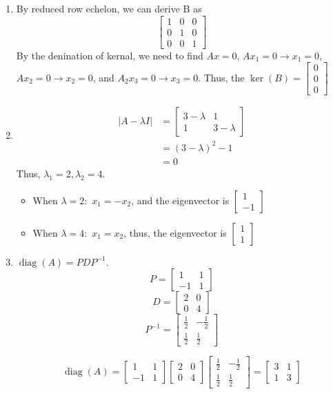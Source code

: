 \documentclass[11pt]{article} %
\begin{document}
\begin{enumerate}
\item By reduced row echelon, we can derive B as 
$$\begin{bmatrix}
	1&0&0\\0&1&0\\0&0&1
\end{bmatrix}$$
By the denination of kernal, we need to find $Ax=0$, $Ax_1=0\rightarrow x_1=0$, $Ax_2=0\rightarrow x_2=0$, and $A_2x_3=0\rightarrow x_3=0$. 
Thus, the $\ker (B)=\begin{bmatrix}
	0\\0\\0
\end{bmatrix}$
\item 
\begin{align*}
	|A-\lambda I|&=\begin{bmatrix}
		3-\lambda&1\\1&3-\lambda
	\end{bmatrix}\\
&=(3-\lambda)^2-1\\
&=0
\end{align*}
Thus, $\lambda_1=2, \lambda_2=4$.
\begin{itemize}
	\item When $\lambda=2:$
	$x_1=-x_2$, and the eigenvector is $\begin{bmatrix}
		1\\-1
	\end{bmatrix}$
\item When $\lambda=4:$
$x_1=x_2$, thus, the eigenvector is $\begin{bmatrix}
	1\\1
\end{bmatrix}$
\end{itemize}


\item 
$\operatorname{diag}{(A)}=PDP^{-1}$. 
$$P=\begin{bmatrix}
	1&1\\-1&1
\end{bmatrix}$$
$$D=\begin{bmatrix}
	2&0\\0&4
\end{bmatrix}$$
$$P^{-1}=\begin{bmatrix}
	\frac{1}{2}&-\frac{1}{2}\\\frac{1}{2}&\frac{1}{2}
\end{bmatrix}$$

$$\operatorname{diag}{(A)}=\begin{bmatrix}
	1&1\\-1&1
\end{bmatrix}\begin{bmatrix}
2&0\\0&4
\end{bmatrix}\begin{bmatrix}
\frac{1}{2}&-\frac{1}{2}\\\frac{1}{2}&\frac{1}{2}
\end{bmatrix}=\begin{bmatrix}
3&1\\1&3
\end{bmatrix}$$


\end{enumerate}
\end{document}
